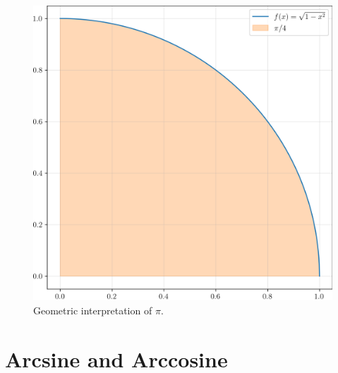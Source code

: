 \documentclass[thmcnt=section, 12pt]{my-elegantbook}
\begin{document}
\begin{figure}[ht]
	\centering
	\includegraphics[scale=0.5]{figures/ma-019.png}
	\caption{Geometric interpretation of $\pi$.}
	\label{fig:19}
\end{figure}


\section{Arcsine and Arccosine}





\printbibliography[heading=bibintoc, title=References]


\printindex

\end{document}
